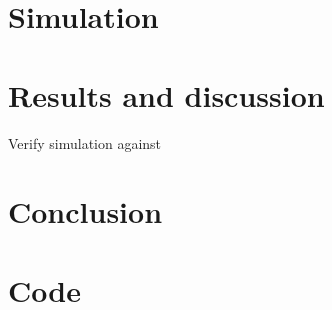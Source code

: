 \documentclass[11pt,a4paper]{article}
\begin{document}
	\section{Simulation}
	
	\section{Results and discussion}
	Verify simulation against \cite{guoetal}
	
	\section{Conclusion}
	
	
	
	
	
	
	\appendix
	\clearpage
	\section{Code}
	
	
\end{document}
